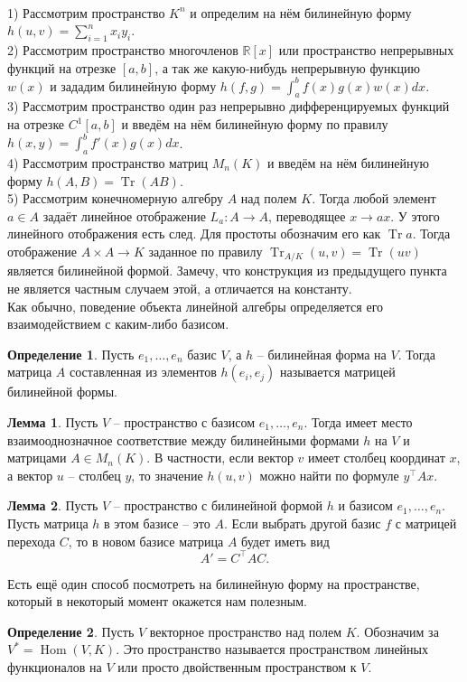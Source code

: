 \documentclass[10pt,a4paper,oneside]{book}
\theoremstyle{definition}
\newtheorem*{defn}{Определение}
\newtheorem{lem}{Лемма}
\newcommand{\mb}[1]{\mathbb{#1}}
\newcommand{\Tr}{\operatorname{Tr}}
\newcommand{\tr}{\operatorname{Tr}}
\newcommand{\Hom}{\operatorname{Hom}}
\def\exm{\noindent {\bf Примеры:}}
\def\dfn{\begin{defn}}
\def\edfn{\end{defn}}
\def\lm{\begin{lem}}
\def\elm{\end{lem}}
\begin{document}
\exm\\
1) Рассмотрим пространство $K^n$ и определим на нём билинейную форму $h(u,v)=\sum_{i=1}^n x_iy_i$.\\
2) Рассмотрим пространство многочленов $\mb R[x]$ или пространство непрерывных функций на отрезке $[a,b]$, а так же какую-нибудь непрерывную функцию $w(x)$ и зададим билинейную форму $h(f,g)=\int_a^b f(x)g(x)w(x)dx$.\\
3) Рассмотрим пространство один раз непрерывно дифференцируемых функций на отрезке $C^1[a,b]$ и введём на нём билинейную форму по правилу $h(x,y)=\int_a^b f'(x)g(x)dx$.\\
4) Рассмотрим пространство матриц $M_n(K)$ и введём на нём билинейную форму $h(A,B)= \Tr(AB)$.\\
5) Рассмотрим конечномерную алгебру $A$ над полем $K$. Тогда любой элемент $a\in A$ задаёт линейное отображение $L_a \colon A \to A$, переводящее $x\to ax$. У этого линейного отображения есть след. Для простоты обозначим его как $\tr a$.
Тогда отображение $A\times A \to K$ заданное по правилу $\tr_{A/K}(u,v)=\tr(uv)$ является билинейной формой. Замечу, что конструкция из предыдущего пункта не является частным случаем этой, а отличается на константу.\\

Как обычно, поведение объекта линейной алгебры определяется его взаимодействием с каким-либо базисом.

\dfn Пусть $e_1, \dots, e_n$ базис $V$, а $h$ -- билинейная форма на $V$. Тогда матрица $A$ составленная из элементов $h(e_i,e_j)$ называется матрицей билинейной формы.
\edfn

\lm Пусть $V$ -- пространство с  базисом $e_1,\dots,e_n$. Тогда имеет место взаимооднозначное соответствие между билинейными формами $h$ на $V$ и матрицами  $A\in M_n(K)$. В частности, если вектор $v$ имеет столбец координат $x$, а вектор $u$ -- столбец $y$, то значение $h(u,v)$ можно найти по формуле $y^{\top}Ax$.
\elm

\lm Пусть $V$ -- пространство с билинейной формой $h$ и базисом $e_1,\dots,e_n$. Пусть матрица $h$ в этом базисе -- это $A$. Если выбрать другой базис $f$ с матрицей перехода $C$, то в новом базисе матрица $A$ будет иметь вид 
$$A'=C^{\top}AC.$$
\elm

Есть ещё один способ посмотреть на билинейную форму на пространстве, который в некоторый момент окажется нам полезным.


\begin{defn} Пусть $V$ векторное пространство над полем $K$. Обозначим за $V^{*}=\Hom(V,K)$. Это пространство называется пространством линейных функционалов на $V$ или просто двойственным пространством к $V$. 
\end{defn}
\end{document}
